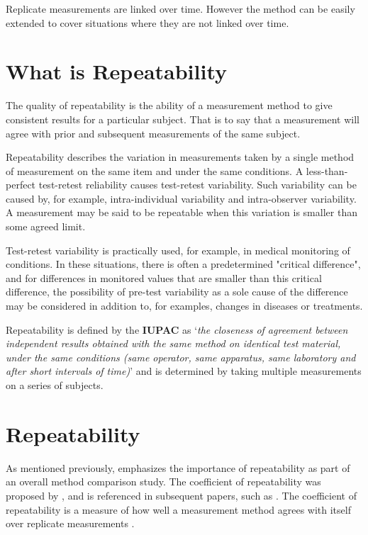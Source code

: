 \documentclass[12pt, a4paper]{report}
\theoremstyle{plain}
\theoremstyle{definition}
\theoremstyle{remark}
\begin{document}
	

	
	Replicate measurements are linked over time. However the method can be easily extended to cover situations where they are not linked over time.
	
		
	
	

	\section{What is Repeatability}
	The quality of repeatability is the ability of a measurement method to give consistent results for a particular subject. That is to say that a measurement will agree with prior and subsequent measurements of the same subject.
	
	
	Repeatability describes the variation in measurements taken by a single method of measurement on the same item and under the same conditions. 
	A less-than-perfect test-retest reliability causes test-retest variability. Such variability can be caused by, for example, intra-individual variability and intra-observer variability. 
	A measurement may be said to be repeatable when this variation is smaller than some agreed limit.
	
	Test-retest variability is practically used, for example, in medical monitoring of conditions. In these situations, there is often a predetermined "critical difference", and for differences in monitored values that are smaller than this critical difference, the possibility of pre-test variability as a sole cause of the difference may be considered in addition to, for examples, changes in diseases or treatments.
	
	Repeatability is defined by the \textbf{IUPAC} as `\textit{the closeness of agreement between independent results obtained with the same method on identical test material, under the same conditions (same
		operator, same apparatus, same laboratory and after short intervals of time)}'  and is determined by taking multiple measurements on a series of subjects.
	
	
	
	
	
	\newpage
	\section{Repeatability}
	As mentioned previously, \citet{Barnhart} emphasizes the importance of repeatability as part of an overall method comparison study. The coefficient of repeatability was proposed by \citet{BA99}, and is referenced in subsequent papers, such as \citet{BXC2008}. The coefficient of repeatability is a measure of how well a
	measurement method agrees with itself over replicate measurements
	\citep{BA99}. 
\end{document}
